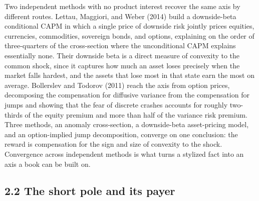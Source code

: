 \documentclass[12pt, a4paper]{article}
\begin{document}
Two independent methods with no product interest recover the same axis
by different routes. Lettau, Maggiori, and Weber (2014) build a
downside-beta conditional CAPM in which a single price of downside risk
jointly prices equities, currencies, commodities, sovereign bonds, and
options, explaining on the order of three-quarters of the cross-section
where the unconditional CAPM explains essentially none. Their downside
beta is a direct measure of convexity to the common shock, since it
captures how much an asset loses precisely when the market falls
hardest, and the assets that lose most in that state earn the most on
average. Bollerslev and Todorov (2011) reach the axis from option
prices, decomposing the compensation for diffusive variance from the
compensation for jumps and showing that the fear of discrete crashes
accounts for roughly two-thirds of the equity premium and more than half
of the variance risk premium. Three methods, an anomaly cross-section, a
downside-beta asset-pricing model, and an option-implied jump
decomposition, converge on one conclusion: the reward is compensation
for the sign and size of convexity to the shock. Convergence across
independent methods is what turns a stylized fact into an axis a book
can be built on.

\subsection*{2.2 The short pole and its
payer}\label{the-short-pole-and-its-payer}
\end{document}
